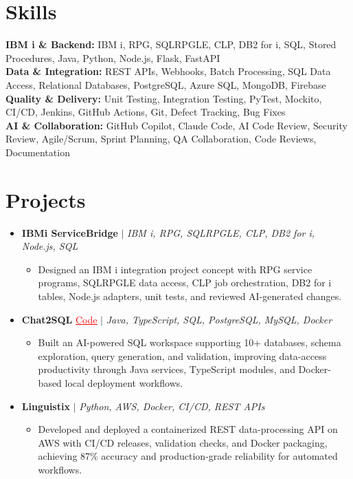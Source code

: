 \documentclass[letterpaper,10pt]{article}
\newcommand{\itemTail}{\vspace{-4pt}}
\newcommand{\sectionGap}{\vspace{-8pt}}
\newcommand{\projGap}{\vspace{1pt}}
\newcommand{\resumeItem}[1]{\item\small{{#1 \itemTail}}}
\newcommand{\resumeProjectHeading}[1]{\item \small #1 \vspace{-2pt}}
\newcommand{\resumeProjectLink}[2]{\href{#1}{\textcolor{red}{\underline{#2}}}}
\newcommand{\resumeSubHeadingListStart}{\begin{itemize}[leftmargin=0.0in, label={}]}
\newcommand{\resumeSubHeadingListEnd}{\end{itemize}}
\newcommand{\resumeProjItemListStart}{\begin{itemize}[leftmargin=0.15in,label=\textbullet,itemsep=3pt,topsep=0pt,parsep=0pt,partopsep=0pt]}
\newcommand{\resumeProjItemListEnd}{\end{itemize}\vspace{-4pt}}
\begin{document}
\section{Skills}
\begin{itemize}[leftmargin=0.15in, label={}]
\small{\item{
\textbf{IBM i \& Backend:} IBM i, RPG, SQLRPGLE, CLP, DB2 for i, SQL, Stored Procedures, Java, Python, Node.js, Flask, FastAPI \\
\textbf{Data \& Integration:} REST APIs, Webhooks, Batch Processing, SQL Data Access, Relational Databases, PostgreSQL, Azure SQL, MongoDB, Firebase \\
\textbf{Quality \& Delivery:} Unit Testing, Integration Testing, PyTest, Mockito, CI/CD, Jenkins, GitHub Actions, Git, Defect Tracking, Bug Fixes \\
\textbf{AI \& Collaboration:} GitHub Copilot, Claude Code, AI Code Review, Security Review, Agile/Scrum, Sprint Planning, QA Collaboration, Code Reviews, Documentation
}}
\end{itemize}
\sectionGap
\section{Projects}
\resumeSubHeadingListStart
\vspace{3pt}
\resumeProjectHeading{\textbf{IBMi ServiceBridge} $|$ \emph{IBM i, RPG, SQLRPGLE, CLP, DB2 for i, Node.js, SQL}}
\resumeProjItemListStart
\resumeItem{Designed an IBM i integration project concept with RPG service programs, SQLRPGLE data access, CLP job orchestration, DB2 for i tables, Node.js adapters, unit tests, and reviewed AI-generated changes.}
\resumeProjItemListEnd
\projGap
\resumeProjectHeading{\textbf{Chat2SQL} \resumeProjectLink{https://github.com/SAHAJ-BHADJA/Chat2SQL}{Code} $|$ \emph{Java, TypeScript, SQL, PostgreSQL, MySQL, Docker}}
\resumeProjItemListStart
\resumeItem{Built an AI-powered SQL workspace supporting 10+ databases, schema exploration, query generation, and validation, improving data-access productivity through Java services, TypeScript modules, and Docker-based local deployment workflows.}
\resumeProjItemListEnd
\projGap
\resumeProjectHeading{\textbf{Linguistix} $|$ \emph{Python, AWS, Docker, CI/CD, REST APIs}}
\resumeProjItemListStart
\resumeItem{Developed and deployed a containerized REST data-processing API on AWS with CI/CD releases, validation checks, and Docker packaging, achieving 87\% accuracy and production-grade reliability for automated workflows.}
\resumeProjItemListEnd
\resumeSubHeadingListEnd
\end{document}
